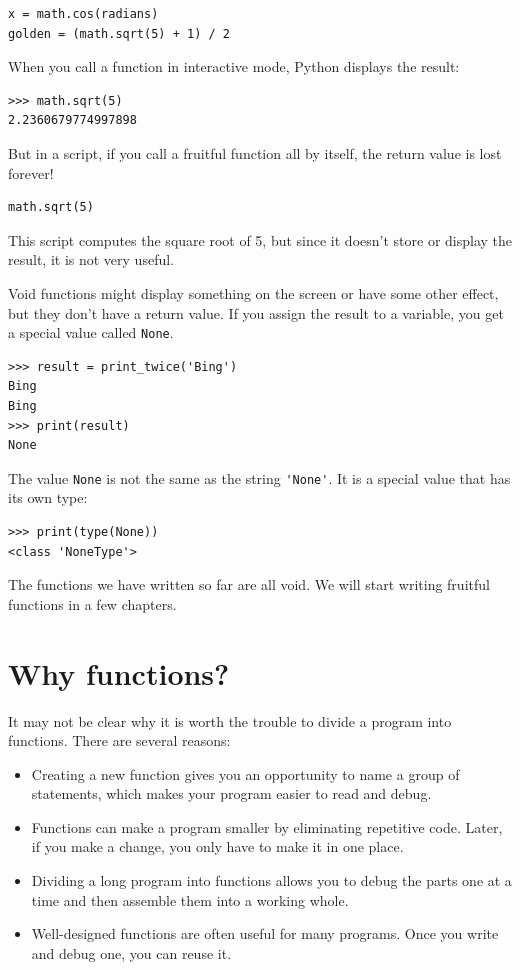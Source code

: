 \begin{lstlisting}
x = math.cos(radians)
golden = (math.sqrt(5) + 1) / 2
\end{lstlisting}
%
When you call a function in interactive mode, Python displays
the result:

\begin{lstlisting}
>>> math.sqrt(5)
2.2360679774997898
\end{lstlisting}
%
But in a script, if you call a fruitful function all by itself,
the return value is lost forever!

\begin{lstlisting}
math.sqrt(5)
\end{lstlisting}
%
This script computes the square root of 5, but since it doesn't store
or display the result, it is not very useful.

Void functions might display something on the screen or have some
other effect, but they don't have a return value.  If you
assign the result to a variable, you get a special value called
{\tt None}.

\begin{lstlisting}
>>> result = print_twice('Bing')
Bing
Bing
>>> print(result)
None
\end{lstlisting}
%
The value {\tt None} is not the same as the string \verb"'None'".
It is a special value that has its own type:

\begin{lstlisting}
>>> print(type(None))
<class 'NoneType'>
\end{lstlisting}
%
The functions we have written so far are all void.  We will start
writing fruitful functions in a few chapters.


%
\section{Why functions?}

It may not be clear why it is worth the trouble to divide
a program into functions.  There are several reasons:

\begin{itemize}

\item Creating a new function gives you an opportunity to name a group
of statements, which makes your program easier to read and debug.

\item Functions can make a program smaller by eliminating repetitive
code.  Later, if you make a change, you only have
to make it in one place.

\item Dividing a long program into functions allows you to debug the
parts one at a time and then assemble them into a working whole.

\item Well-designed functions are often useful for many programs.
Once you write and debug one, you can reuse it.

\end{itemize}


